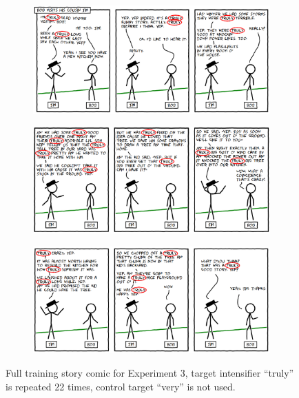 \documentclass[10pt,letterpaper]{article}
\begin{document}
\begin{figure}
        \centering
        \begin{subfigure}[b]{0.45\textwidth}
                \includegraphics[width=\textwidth]{analysis_files_for_writeup/images/story1_truly_circles.png}
        \end{subfigure}%
        
        \begin{subfigure}[b]{0.45\textwidth}
                \includegraphics[width=\textwidth]{analysis_files_for_writeup/images/story2_truly_circles.png}
        \end{subfigure}
        
        \begin{subfigure}[b]{0.45\textwidth}
                \includegraphics[width=\textwidth]{analysis_files_for_writeup/images/story3_truly_circles.png}
        \end{subfigure}
        \caption{Full training story comic for Experiment 3, target intensifier ``truly'' is repeated 22 times, control target ``very'' is not used.}\label{exp3-story}
\end{figure}
\end{document}
